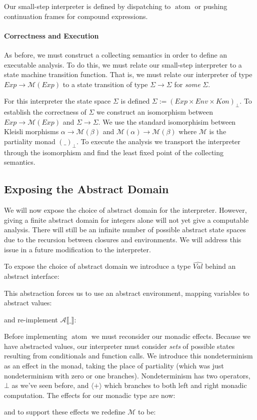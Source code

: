 \documentclass[pldi]{sigplanconf}
\newcommand{\atomf}{\operatorname{atom}}
\newcommand{\AVal}{\widehat{Val}}
\newcommand{\mplus}{\mathbin{⟨+⟩}}
\begin{document}
Our small-step interpreter is defined by dispatching to $\atomf$ or pushing continuation frames for compound expressions.


\paragraph{Correctness and Execution}

As before, we must construct a collecting semantics in order to define an executable analysis.
To do this, we must relate our small-step interpreter to a state machine transition function.
That is, we must relate our interpreter of type $Exp → ℳ (Exp)$ to a state transition of type $Σ → Σ$ for \emph{some} $Σ$.

For this interpreter the state space $Σ$ is defined $Σ := {(Exp × Env × Kon)}_⊥$.
To establish the correctness of $Σ$ we construct an isomorphism between $Exp → ℳ (Exp)$ and $Σ → Σ$.
We use the standard isomorphisim between Kleisli morphisms $α → ℳ (β)$ and $ℳ (α) → ℳ (β)$ where $ℳ $ is the partiality monad ${(\_)}_⊥$.
To execute the analysis we transport the interpreter through the isomorphism and find the least fixed point of the collecting semantics.


\subsection{Exposing the Abstract Domain}

We will now expose the choice of abstract domain for the interpreter.
However, giving a finite abstract domain for integers alone will not yet give a computable analysis.
There will still be an infinite number of possible abstract state spaces due to the recursion between closures and environments.
We will address this issue in a future modification to the interpreter.

To expose the choice of abstract domain we introduce a type $\AVal$ behind an abstract interface:


This abstraction forces us to use an abstract environment, mapping variables to abstract values:

and re-implement $𝒜 ⟦\_⟧$:


Before implementing $\atomf$ we must reconsider our monadic effects.
Because we have abstracted values, our interpreter must consider \emph{sets} of possible states resulting from conditionals and function calls.
We introduce this nondeterminism as an effect in the monad, taking the place of partiality (which was just nondeterminism with zero or one branches).
Nondeterminism has two operators, $⊥$ as we've seen before, and $\mplus$ which branches to both left and right monadic computation.
The effects for our monadic type are now:

and to support these effects we redefine $ℳ $ to be:

\end{document}
